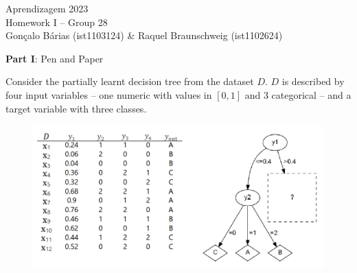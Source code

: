 \documentclass[12pt]{article}
\begin{document}
\begin{center}
\large{Aprendizagem 2023}\\
Homework I -- Group 28\\
\vskip 0.3cm
Gonçalo Bárias (ist1103124) \& Raquel Braunschweig (ist1102624)\vskip 1cm

\large{\textbf{Part I}: Pen and Paper}\normalsize
\end{center}

\noindent Consider the partially learnt decision tree from the dataset $D$. $D$ is described by four input variables –
one numeric with values in $[0,1]$ and 3 categorical – and a target variable with three classes.

\begin{figure}[H]
    \centering
    \includegraphics[width=15cm]{./assets/partial_tree_dataset_d}
    \label{fig:PartI-partial-decision-tree-dataset-d}
\end{figure}
\end{document}
